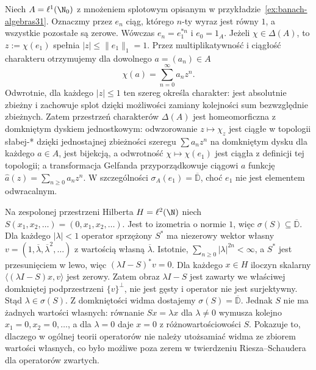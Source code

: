 \begin{przyklad}
\label{ex:l1-characters31}
Niech $A=\ell^1(\N_0)$ z mnożeniem splotowym opisanym
w przykładzie~\ref{ex:banach-algebras31}. Oznaczmy przez $e_n$ ciąg,
którego $n$-ty wyraz jest równy $1$, a wszystkie pozostałe są zerowe.
Wówczas $e_n=e_1^{*n}$ i $e_0=1_A$.
Jeżeli $\chi\in\Delta(A)$, to $z:=\chi(e_1)$ spełnia
$|z|\le\|e_1\|_1=1$. Przez multiplikatywność i ciągłość charakteru
otrzymujemy dla dowolnego $a=(a_n)\in A$
\[
 \chi(a)=\sum_{n=0}^\infty a_nz^n.
\]
Odwrotnie, dla każdego $|z|\le1$ ten szereg określa charakter:
jest absolutnie zbieżny i zachowuje splot dzięki możliwości zamiany
kolejności sum bezwzględnie zbieżnych. Zatem przestrzeń charakterów
$\Delta(A)$ jest homeomorficzna z domkniętym dyskiem jednostkowym:
odwzorowanie $z\mapsto\chi_z$ jest ciągłe w topologii
słabej-* dzięki jednostajnej zbieżności szeregu
$\sum a_nz^n$ na domkniętym dysku dla każdego $a\in A$,
jest bijekcją, a odwrotność $\chi\mapsto\chi(e_1)$
jest ciągła z definicji tej topologii; a transformacja Gelfanda przyporządkowuje
ciągowi $a$ funkcję $\widehat a(z)=\sum_{n\ge0}a_nz^n$.
W szczególności $\sigma_A(e_1)=\overline{\mathbb D}$,
choć $e_1$ nie jest elementem odwracalnym.
\end{przyklad}

\begin{przyklad}
\label{ex:unilateral-shift31}
Na zespolonej przestrzeni Hilberta $H=\ell^2(\N)$ niech
$S(x_1,x_2,\ldots)=(0,x_1,x_2,\ldots)$.
Jest to izometria o normie $1$, więc $\sigma(S)\subseteq\overline{\mathbb D}$.
Dla każdego $|\lambda|<1$ operator sprzężony $S^*$ ma niezerowy
wektor własny $v=(1,\overline\lambda,\overline\lambda^2,\ldots)$
z wartością własną $\overline\lambda$.
Istotnie, $\sum_{n\ge0}|\lambda|^{2n}<\infty$,
a $S^*$ jest przesunięciem w lewo, więc
$(\lambda I-S)^*v=0$. Dla każdego $x\in H$
iloczyn skalarny $\langle(\lambda I-S)x,v\rangle$
jest zerowy. Zatem obraz $\lambda I-S$ jest zawarty
we właściwej domkniętej podprzestrzeni $\{v\}^\perp$,
nie jest gęsty i operator nie jest surjektywny.
Stąd $\lambda\in\sigma(S)$.
Z domkniętości widma dostajemy $\sigma(S)=\overline{\mathbb D}$.
Jednak $S$ nie ma żadnych wartości własnych: równanie $Sx=\lambda x$
dla $\lambda\ne0$ wymusza kolejno $x_1=0,x_2=0,\ldots$,
a dla $\lambda=0$ daje $x=0$ z różnowartościowości $S$.
Pokazuje to, dlaczego w ogólnej teorii operatorów nie należy
utożsamiać widma ze zbiorem wartości własnych, co było możliwe
poza zerem w twierdzeniu Riesza--Schaudera dla operatorów zwartych.
\end{przyklad}
